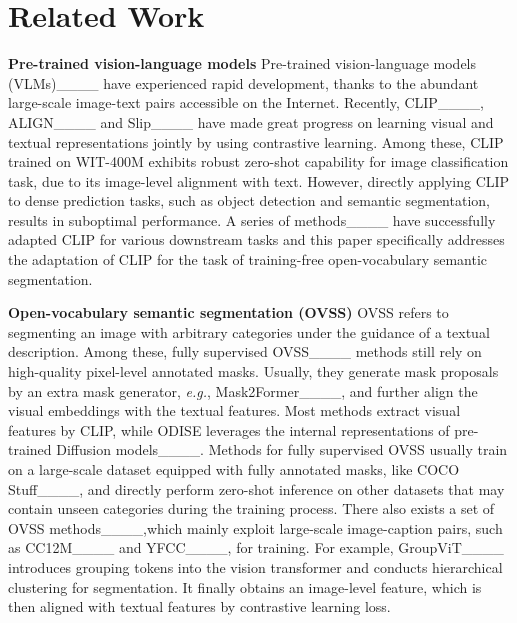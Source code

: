 \section{Related Work}
\label{sec:related_work}

\noindent \textbf{Pre-trained vision-language models}
Pre-trained vision-language models (VLMs)____ have experienced rapid development, thanks to the abundant large-scale image-text pairs accessible on the Internet.
Recently, CLIP____, ALIGN____ and Slip____ have made great progress on learning visual and textual representations jointly by using contrastive learning. 
Among these, CLIP trained on WIT-400M exhibits robust zero-shot capability for image classification task, due to its image-level alignment with text.
However, directly applying CLIP to dense prediction tasks, such as object detection and semantic segmentation, results in suboptimal performance.
A series of methods____ have successfully adapted CLIP for various downstream tasks and this paper specifically addresses the adaptation of CLIP for the task of training-free open-vocabulary semantic segmentation.

\noindent \textbf{Open-vocabulary semantic segmentation (OVSS)}
OVSS refers to segmenting an image with arbitrary categories under the guidance of a textual description.
Among these, fully supervised OVSS____ methods still rely on high-quality pixel-level annotated masks.
Usually, they generate mask proposals by an extra mask generator, \emph{e.g.}, Mask2Former____, and further align the visual embeddings with the textual features.
Most methods extract visual features by CLIP, while ODISE leverages the internal representations of pre-trained Diffusion models____.
Methods for fully supervised OVSS usually train on a large-scale dataset equipped with fully annotated masks, like COCO Stuff____, and directly perform zero-shot inference on other datasets that may contain unseen categories during the training process.
There also exists a set of OVSS methods____,which mainly exploit large-scale image-caption pairs, such as CC12M____ and YFCC____, for training.
For example, GroupViT____ introduces grouping tokens into the vision transformer and conducts hierarchical clustering for segmentation.
It finally obtains an image-level feature, which is then aligned with textual features by contrastive learning loss.

